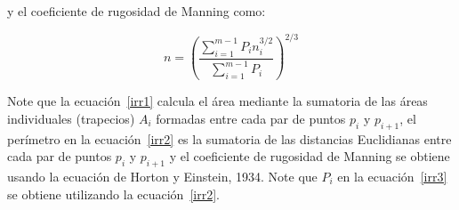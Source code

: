 \documentclass[11pt, oneside]{article}
\begin{document}
y el coeficiente de rugosidad de Manning como:

\begin{equation}
n = \left( \frac{\sum_{i=1}^{m-1} P_i n_i^{3/2}}{\sum_{i=1}^{m-1} P_i} \right)^{2/3}
\label{irr3}
\end{equation}

Note que la ecuaci\'on~\ref{irr1} calcula el \'area mediante la sumatoria de las áreas individuales (trapecios) $A_i$ formadas entre cada par de puntos $p_i$ y $p_{i+1}$, el perímetro en la ecuaci\'on~\ref{irr2} es la sumatoria de las distancias Euclidianas entre cada par de puntos $p_i$ y $p_{i+1}$ y el coeficiente de rugosidad de Manning  se obtiene usando la ecuación de Horton y Einstein, 1934. Note que $P_i$ en la ecuaci\'on~\ref{irr3} se obtiene utilizando la ecuaci\'on~\ref{irr2}.
\end{document}
